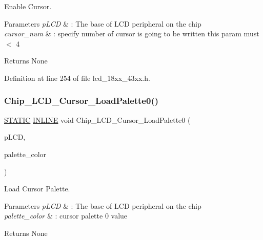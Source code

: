 Enable Cursor. 


\begin{DoxyParams}{Parameters}
{\em p\+L\+CD} & \+: The base of L\+CD peripheral on the chip \\
\hline
{\em cursor\+\_\+num} & \+: specify number of cursor is going to be written this param must $<$ 4 \\
\hline
\end{DoxyParams}
\begin{DoxyReturn}{Returns}
None 
\end{DoxyReturn}


Definition at line 254 of file lcd\+\_\+18xx\+\_\+43xx.\+h.

\mbox{\label{group___l_c_d__18_x_x__43_x_x_ga164119b0cf9ee7d42cf1be435c60e4f5}} 
\subsubsection{\texorpdfstring{Chip\+\_\+\+L\+C\+D\+\_\+\+Cursor\+\_\+\+Load\+Palette0()}{Chip\_LCD\_Cursor\_LoadPalette0()}}
{\footnotesize\ttfamily \hyperlink{group___l_p_c___types___public___macros_ga10b2d890d871e1489bb02b7e70d9bdfb}{S\+T\+A\+T\+IC} \hyperlink{spifi__18xx__43xx_8h_a2eb6f9e0395b47b8d5e3eeae4fe0c116}{I\+N\+L\+I\+NE} void Chip\+\_\+\+L\+C\+D\+\_\+\+Cursor\+\_\+\+Load\+Palette0 (\begin{DoxyParamCaption}\item[{\hyperlink{struct_l_p_c___l_c_d___t}{L\+P\+C\+\_\+\+L\+C\+D\+\_\+T} $\ast$}]{p\+L\+CD,  }\item[{uint32\+\_\+t}]{palette\+\_\+color }\end{DoxyParamCaption})}



Load Cursor Palette. 


\begin{DoxyParams}{Parameters}
{\em p\+L\+CD} & \+: The base of L\+CD peripheral on the chip \\
\hline
{\em palette\+\_\+color} & \+: cursor palette 0 value \\
\hline
\end{DoxyParams}
\begin{DoxyReturn}{Returns}
None 
\end{DoxyReturn}


